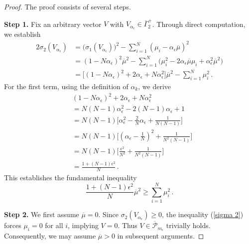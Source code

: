\documentclass[12pt, twoside]{article}
\theoremstyle{definition}
\numberwithin{equation}{section}
\begin{document}
\begin{proof}
The proof consists of several steps.\medskip

\noindent\textbf{Step 1.}  Fix an arbitrary vector $V$ with $V_{\alpha_{\epsilon}}\in \overline{\Gamma}^{+}_{2}$. Through direct computation, we establish 
\begin{equation*}
\begin{split}
2\sigma_{2}(V_{\alpha_{\epsilon}})&=\big(\sigma_{1}(V_{\alpha_{\epsilon}})\big)^2-\sum_{i=1}^{N}(\mu_{i}-\alpha_{\epsilon}\overline{\mu})^2\\
&=(1-N\alpha_{\epsilon})^{2}\overline{\mu}^{2}-\sum_{i=1}^{N}\big(\mu_{i}^{2}-2\alpha_{\epsilon}\overline{\mu}\mu_{i}+\alpha_{\epsilon}^{2}\overline{\mu}^{2} \big)\\
&=\big[(1-N\alpha_{\epsilon})^{2}+2\alpha_{\epsilon}+N\alpha_{\epsilon}^{2} \big]\overline{\mu}^{2}-\sum_{i=1}^{N}\mu_{i}^{2}\,.
\end{split}
\end{equation*}
For the first term, using the definition of $\alpha_{k}$, we derive
\begin{equation*}
\begin{split}
&(1-N\alpha_{\epsilon})^{2}+2\alpha_{\epsilon}+N\alpha_{\epsilon}^{2}\\
&=N(N-1)\alpha_{\epsilon}^{2}-2(N-1)\alpha_{\epsilon}+1\\
&=N(N-1)\big[\alpha_{\epsilon}^{2}-\frac{2}{N}\alpha_{\epsilon}+\frac{1}{N(N-1)} \big]\\
&=N(N-1)\big[(\alpha_{\epsilon}-\frac{1}{N})^{2}+\frac{1}{N^{2}(N-1)} \big]\\
&=N(N-1)\big[\frac{\epsilon^{2}}{N^{2}}+\frac{1}{N^{2}(N-1)} \big]\\
&=\frac{1+(N-1)\epsilon^2}{N}\,.
\end{split}
\end{equation*}
This establishes the fundamental inequality 
\begin{equation}\label{sigma 2}
\frac{1+(N-1)\epsilon^2}{N}\overline{\mu}^{2}\geq \sum_{i=1}^{N}\mu_{i}^{2}\,.
\end{equation}

\noindent\textbf{Step 2.} We first assume $\overline{\mu}=0$.
Since $\sigma_{2}(V_{\alpha_{\epsilon}})\geq 0$,  the inequality (\ref{sigma 2}) forces $\mu_{i}=0$ for all $i$, implying $V=0$. Thus $V\in \overline{\mathcal{P}}_{m_{\epsilon}}$ trivially holds. Consequently, we may assume $\overline{\mu}>0$ in subsequent arguments. 


\end{proof}
\end{document}
